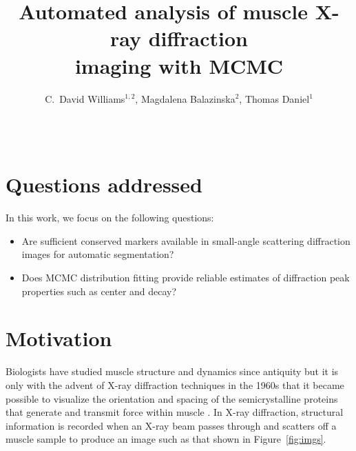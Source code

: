 \documentclass{sig-alternate}
\newcommand{\note}[2]{
    \textbf{\textcolor{#1}{#2}}
}
\newcommand{\dave}[1]{\note{PineGreen}{Dave: #1}}
\begin{document}
\title{Automated analysis of muscle X-ray diffraction \\ imaging with MCMC}
\author{C.\ David Williams$^{1,2}$,  Magdalena Balazinska$^2$, Thomas Daniel$^1$ \\
\\
 \\
}
\maketitle





\sloppy

\section{Questions addressed}
\label{sec:addressed}


In this work, we focus on the following questions:

\begin{itemize}[noitemsep]
\item Are sufficient conserved markers available in small-angle scattering diffraction images for automatic segmentation?
\item Does MCMC distribution fitting provide reliable estimates of diffraction peak properties such as center and decay?
\end{itemize}


\section{Motivation}
\label{sec:motivation}


Biologists have studied muscle structure and dynamics since antiquity
but it is only with the advent of X-ray diffraction techniques in the
1960s that it became possible to visualize the orientation and spacing
of the semicrystalline proteins that generate and transmit force
within muscle \cite{Millman1998}. In X-ray diffraction, structural
information is recorded when an X-ray beam passes through and scatters
off a muscle sample to produce an image such as that shown in
Figure~\ref{fig:imgs}.
\end{document}
